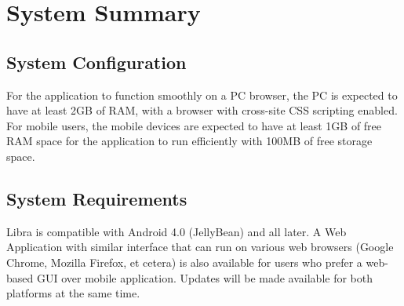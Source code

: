 \chapter{System Summary}
\section{System Configuration}

For the application to function smoothly on a PC browser, the PC is expected to have at least 2GB of RAM, with a browser with cross-site CSS scripting enabled.\\
For mobile users, the mobile devices are expected to have at least 1GB of free RAM space for the application to run efficiently with 100MB of free storage space.


\section{System Requirements}

Libra is compatible with Android 4.0 (JellyBean) and all later. A Web Application with similar interface that can run on various web browsers (Google Chrome, Mozilla Firefox, et cetera) is also available for users who prefer a web-based GUI over mobile application. Updates will be made available for both platforms at the same time.

